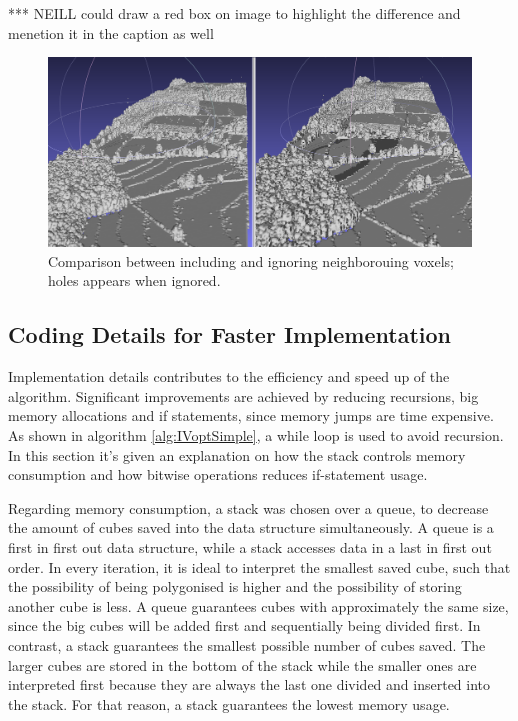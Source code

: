 \documentclass{subfiles}
\begin{document}
{\color{red} *** NEILL could draw a red box on image to highlight the difference and menetion it in the caption as well }
\begin{figure}[!htbp]
	\centering
	\includegraphics[width=5.5in]{img/HolesNeighbours}
	\caption{Comparison between including and ignoring neighborouing voxels; holes appears when ignored.}
	\label{fig:IVholesNeighbours}
\end{figure}

\subsection{Coding Details for Faster Implementation}\label{sec:IVcodeDetails}
Implementation details contributes to the efficiency and speed up of the algorithm. Significant improvements are achieved by reducing recursions, big memory allocations and if statements, since memory jumps are time expensive. As shown in algorithm \ref{alg:IVoptSimple}, a while loop is used to avoid recursion. In this section it's given an explanation on how the stack controls memory consumption and how bitwise operations reduces if-statement usage. 

Regarding memory consumption, a stack was chosen over a queue, to decrease the amount of cubes saved into the data structure simultaneously. A queue is a first in first out data structure, while a stack accesses data in a last in first out order. In every iteration, it is ideal to interpret the smallest saved cube, such that the possibility of being polygonised is higher and the possibility of storing another cube is less. A queue guarantees cubes with approximately the same size, since the big cubes will be added first and sequentially being divided first. In contrast, a stack guarantees the smallest possible number of cubes saved. The larger cubes are stored in the bottom of the stack while the smaller ones are interpreted first because they are always the last one divided and inserted into the stack.  For that reason, a stack guarantees the lowest memory usage. 
\end{document}
